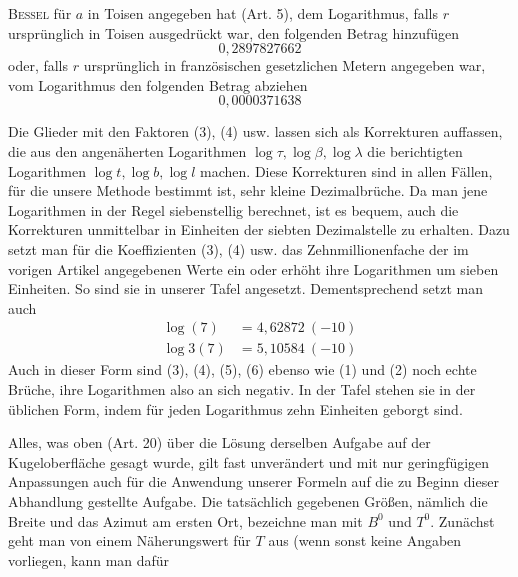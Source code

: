 %
\textsc{Bessel} für \(a\) in Toisen angegeben hat (Art. 5), dem Logarithmus, falls \(r\) ursprünglich in Toisen ausgedrückt war, den folgenden Betrag hinzufügen
\[
0{,}2897827662
\]
oder, falls \(r\) ursprünglich in französischen gesetzlichen Metern angegeben war, vom Logarithmus den folgenden Betrag abziehen
\[
0{,}0000371638
\]

Die Glieder mit den Faktoren (3), (4) usw. lassen sich als Korrekturen auffassen, die aus den angenäherten Logarithmen \(\log\tau,\log\beta,\log\lambda\) die berichtigten Logarithmen \(\log t,\log b,\log l\) machen. Diese Korrekturen sind in allen Fällen, für die unsere Methode bestimmt ist, sehr kleine Dezimalbrüche. Da man jene Logarithmen in der Regel siebenstellig berechnet, ist es bequem, auch die Korrekturen unmittelbar in Einheiten der siebten Dezimalstelle zu erhalten. Dazu setzt man für die Koeffizienten (3), (4) usw. das Zehnmillionenfache der im vorigen Artikel angegebenen Werte ein oder erhöht ihre Logarithmen um sieben Einheiten. So sind sie in unserer Tafel angesetzt. Dementsprechend setzt man auch
\[
\begin{aligned}
\log(7)&=4{,}62872\ (-10)\\
\log3(7)&=5{,}10584\ (-10)
\end{aligned}
\]
Auch in dieser Form sind (3), (4), (5), (6) ebenso wie (1) und (2) noch echte Brüche, ihre Logarithmen also an sich negativ. In der Tafel stehen sie in der üblichen Form, indem für jeden Logarithmus zehn Einheiten geborgt sind.

Alles, was oben (Art. 20) über die Lösung derselben Aufgabe auf der Kugeloberfläche gesagt wurde, gilt fast unverändert und mit nur geringfügigen Anpassungen auch für die Anwendung unserer Formeln auf die zu Beginn dieser Abhandlung gestellte Aufgabe. Die tatsächlich gegebenen Größen, nämlich die Breite und das Azimut am ersten Ort, bezeichne man mit \(B^0\) und \(T^0\). Zunächst geht man von einem Näherungswert für \(T\) aus (wenn sonst keine Angaben vorliegen, kann man dafür %
